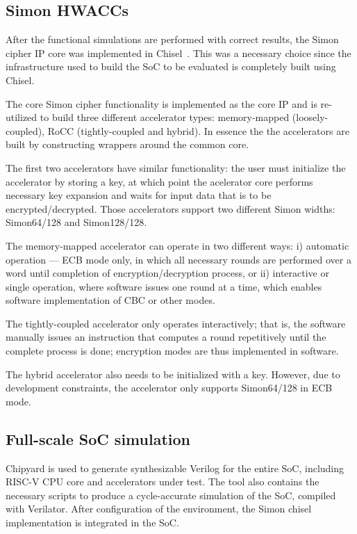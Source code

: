 \documentclass[10pt,conference]{IEEEtran}
\begin{document}
\subsection{Simon HWACCs}

After the functional simulations are performed with correct results, the Simon
cipher IP core was implemented in Chisel~\cite{chisel}. This was a necessary
choice since the infrastructure used to build the SoC to be evaluated is
completely built using Chisel.

The core Simon cipher functionality is implemented as the core IP and is
re-utilized to build three different accelerator types: memory-mapped
(loosely-coupled), RoCC (tightly-coupled and hybrid). In essence the the
accelerators are built by constructing wrappers around the common core.

The first two accelerators have similar functionality: the user must initialize the
accelerator by storing a key, at which point the acelerator core performs
necessary key expansion and waits for input data that is to be
encrypted/decrypted. Those accelerators support two different Simon widths:
Simon64/128 and Simon128/128.

The memory-mapped accelerator can operate in two different ways: i) automatic
operation --- ECB mode only, in which all necessary rounds are performed over a word until
completion of encryption/decryption process, or ii) interactive or single operation, where
software issues one round at a time, which enables software implementation of
CBC or other modes.

The tightly-coupled accelerator only operates interactively; that is, the
software manually issues an instruction that computes a round repetitively
until the complete process is done; encryption modes are thus
implemented in software.

The hybrid accelerator also needs to be initialized with a key. However, due to
development constraints, the accelerator only supports Simon64/128 in ECB mode.


\subsection{Full-scale SoC simulation}

Chipyard is used to generate synthesizable Verilog for the
entire SoC, including RISC-V CPU core and accelerators under test. The tool also
contains the necessary scripts to produce a cycle-accurate simulation of the
SoC, compiled with Verilator. After configuration of the environment, the Simon
chisel implementation is integrated in the SoC.
\end{document}
